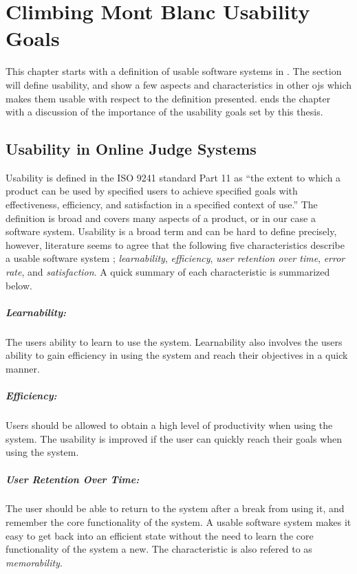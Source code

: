 \chapter{Climbing Mont Blanc Usability Goals}
\label{ch:design}
This chapter starts with a definition of usable software systems in . The section will define usability, and show a few aspects and characteristics in other \glspl{oj} which makes them usable with respect to the definition presented.  ends the chapter with a discussion of the importance of the usability goals set by this thesis.

\section{Usability in Online Judge Systems}
\label{sec:usability-def}
Usability is defined in the ISO 9241 standard Part 11 \cite{ISO1998} as ``the extent to which a product can be used by specified users to achieve specified goals with effectiveness, efficiency, and satisfaction in a specified context of use.'' The definition is broad and covers many aspects of a product, or in our case a software system. Usability is a broad term and can be hard to define precisely, however, literature seems to agree that the following five characteristics describe a usable software system  \cite{holzinger2005, ferre2001}; \textit{learnability}, \textit{efficiency}, \textit{user retention over time}, \textit{error rate}, and \textit{satisfaction}. A quick summary of each characteristic is summarized below.

\paragraph*{Learnability:} The users ability to learn to use the system. Learnability also involves the users ability to gain efficiency in using the system and reach their objectives in a quick manner.

\paragraph*{Efficiency:} Users should be allowed to obtain a high level of productivity when using the system. The usability is improved if the user can quickly reach their goals when using the system.

\paragraph*{User Retention Over Time:} The user should be able to return to the system after a break from using it, and remember the core functionality of the system. A usable software system makes it easy to get back into an efficient state without the need to learn the core functionality of the system a new. The characteristic is also refered to as \textit{memorability}.

